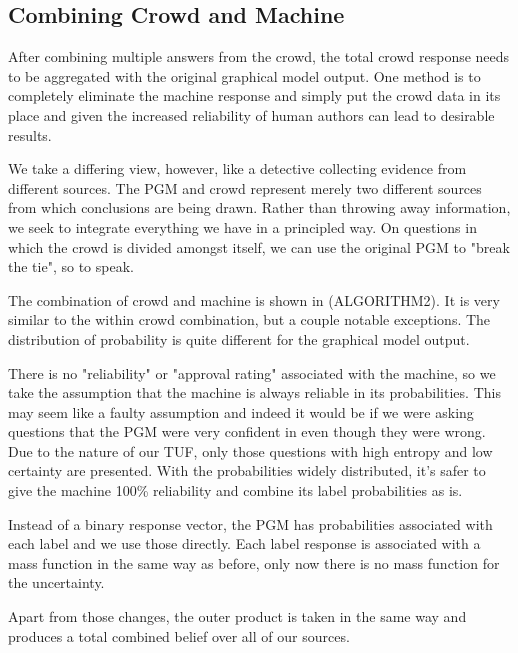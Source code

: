 \subsection{Combining Crowd and Machine}

After combining multiple answers from the crowd, the total crowd response needs to be aggregated with the original graphical model output.  One method is to completely eliminate the machine response and simply put the crowd data in its place and given the increased reliability of human authors can lead to desirable results.

We take a differing view, however, like a detective collecting evidence from different sources.  The PGM and crowd represent merely two different sources from which conclusions are being drawn.  Rather than throwing away information, we seek to integrate everything we have in a principled way.  On questions in which the crowd is divided amongst itself, we can use the original PGM to "break the tie", so to speak.

The combination of crowd and machine is shown in (ALGORITHM2).  It is very similar to the within crowd combination, but a couple notable exceptions.  The distribution of probability is quite different for the graphical model output.  

There is no "reliability" or "approval rating" associated with the machine, so we take the assumption that the machine is always reliable in its probabilities.  This may seem like a faulty assumption and indeed it would be if we were asking questions that the PGM were very confident in even though they were wrong.  Due to the nature of our TUF, only those questions with high entropy and low certainty are presented.  With the probabilities widely distributed, it's safer to give the machine 100\% reliability and combine its label probabilities as is.

Instead of a binary response vector, the PGM has probabilities associated with each label and we use those directly.  Each label response is associated with a mass function in the same way as before, only now there is no mass function for the uncertainty.

Apart from those changes, the outer product is taken in the same way and produces a total combined belief over all of our sources.
